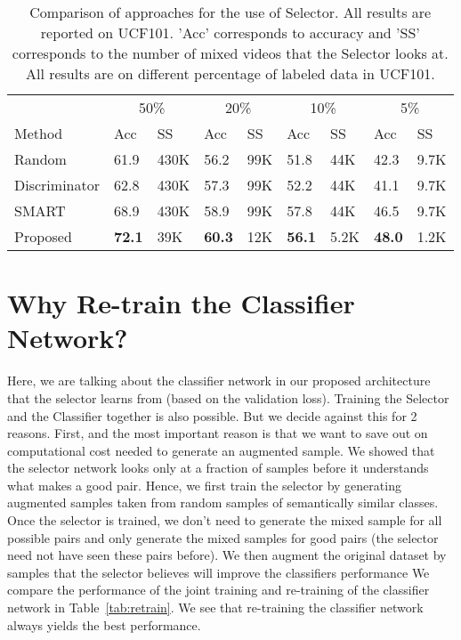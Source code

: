 \documentclass[runningheads]{llncs}
\begin{document}
\begin{table}[htb]
\begin{center}
    

\begin{tabular}{lllllllll}
              & \multicolumn{2}{c}{50\%}     & \multicolumn{2}{c}{20\%}     & \multicolumn{2}{c}{10\%}     & \multicolumn{2}{c}{5\%}      \\
Method        & Acc     & SS & Acc     & SS & Acc      & SS & Acc     & SS \\ 
\hline
Random        & 61.9          & 430K         & 56.2         & 99K          & 51.8          & 44K          & 42.3          & 9.7K         \\
Discriminator & 62.8          & 430K         & 57.3         & 99K          & 52.2          & 44K          & 41.1          & 9.7K         \\
SMART \cite{smart} & 68.9 & 430K & 58.9 & 99K & 57.8 & 44K & 46.5 & 9.7K \\
Proposed      & \textbf{72.1} & 39K          & \textbf{60.3} & 12K          & \textbf{56.1} & 5.2K         & \textbf{48.0} & 1.2K     \\   
\end{tabular}
\end{center}
\caption{Comparison of approaches for the use of Selector. All results are reported on UCF101. 'Acc' corresponds to accuracy and 'SS' corresponds to the number of mixed videos that the Selector looks at. All results are on different percentage of labeled data in UCF101.}
\label{tab:selector}
\end{table}

\section{Why Re-train the Classifier Network?}
\label{re-train}
Here, we are talking about the classifier network in our proposed architecture that the selector learns from (based on the validation loss).
Training the Selector and the Classifier together is also possible. But we decide against this for 2 reasons. First, and the most important reason is that we want to save out on computational cost needed to generate an augmented sample. We showed that the selector network looks only at a fraction of samples before it understands what makes a good pair. Hence, we first train the selector by generating augmented samples taken from random samples of semantically similar classes. Once the selector is trained, we don't need to generate the mixed sample for all possible pairs and only generate the mixed samples for good pairs (the selector need not have seen these pairs before). We then augment the original dataset by samples that the selector believes will improve the classifiers performance We compare the performance of the joint training and re-training of the classifier network in Table~\ref{tab:retrain}. We see that re-training the classifier network always yields the best performance.
\end{document}
